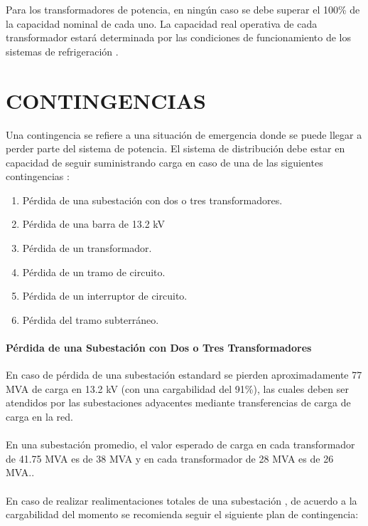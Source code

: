 \documentclass[a5paper]{book}%
\begin{document}
Para los transformadores de potencia, en ningún caso se debe superar
el 100\% de la capacidad nominal de cada uno. La capacidad real
operativa de cada transformador estará determinada por las condiciones
de funcionamiento de los sistemas de refrigeración \cite{MANOPEMCALI}.


\chapter{CONTINGENCIAS}

Una contingencia se refiere a una situación de emergencia donde se puede llegar a perder parte del sistema de potencia. El sistema de distribución debe estar en capacidad de seguir suministrando carga en caso de una de las siguientes contingencias \cite{EMCALI2007}:

\begin{enumerate}
	\item Pérdida de una subestación con dos o tres transformadores.
	\item Pérdida de una barra de 13.2 kV
	\item Pérdida de un transformador.
	\item Pérdida de un tramo de circuito.
	\item Pérdida de un interruptor de circuito.
	\item Pérdida del tramo subterráneo.
\end{enumerate}

\subsubsection{Pérdida de una Subestación con Dos o Tres Transformadores}

En caso de pérdida de una subestación estandard se pierden
aproximadamente 77 MVA de carga en 13.2 kV (con una cargabilidad del 91\%), las cuales deben ser atendidos por las subestaciones adyacentes mediante transferencias de carga  de carga en la red.\\\\
 En una subestación promedio, el valor esperado de carga en cada transformador de 41.75 MVA es de 38 MVA y en cada transformador de 28 MVA es de 26 MVA.\cite{EMCALI2007}.\\\\

En caso de realizar realimentaciones totales de una subestación , de acuerdo a la cargabilidad del momento se recomienda seguir el siguiente plan de contingencia:
\end{document}
